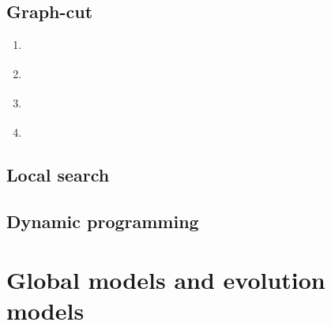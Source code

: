 \subsection{Graph-cut}	
	\begin{enumerate}
		\item{ \cite{kolmogorov04} }
		\item{ \cite{boykov01a} }
		\item{ \cite{boykov03} }
		\item{ \cite{boykov01b}	}
	\end{enumerate}
	
\subsection{Local search}	
	
\subsection{Dynamic programming}	

\section{Global models and evolution models}

